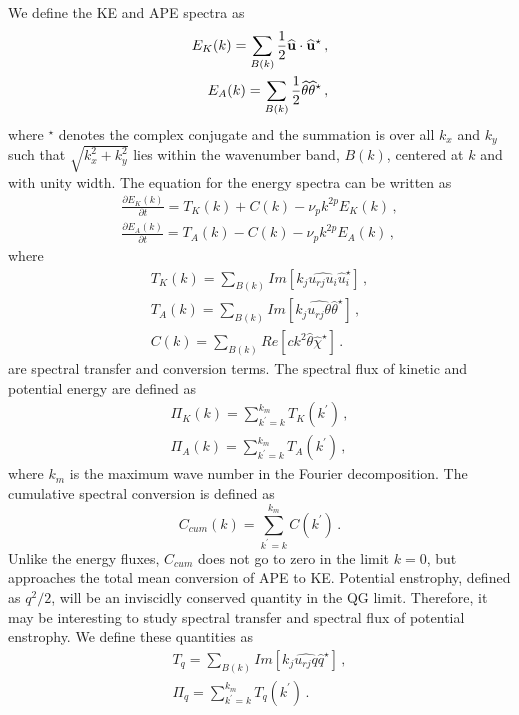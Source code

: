 We define the KE and APE spectra as 
\begin{eqnarray} 
E_K(k) =\sum_{B(k)}  \frac{1}{2}  \widehat{\bf u} \cdot \widehat{\bf u}^{\star}  \, , \\
E_A(k) = \sum_{B(k)} \frac{1}{2} \widehat{\theta} \widehat{\theta}^{\star} \, ,
\end{eqnarray} 
where $ ^{\star} $ denotes the complex conjugate and the summation is over 
all $ k_x $ and $ k_y $ such that $ \sqrt{k_x^2+k_y^{2}} $ lies within the wavenumber band,  $ B(k) $,   centered at $ k $ and with unity width. The equation for the energy spectra can be written as
\begin{eqnarray}
\frac{\partial{E_K}(k)} {\partial t}  = T_K(k) + C (k) - \nu_p k^{2p} E_K(k) \, , \\
\frac{\partial{E_A}(k)} {\partial t}  = T_A(k) - C (k) - \nu_p k^{2p} E_A(k) \, ,
\end{eqnarray} 
where 
\begin{eqnarray}
T_{K}(k) = \sum_{B(k)} Im [  k_j \widehat{u_{rj} u_i} \widehat{u}_i ^{\star} ]  \, , \\
T_{A}(k)  = \sum_{B(k)} Im [ k_j \widehat{u_{rj} \theta} \widehat{\theta} ^{\star}] \, , \\
C (k) = \sum_{B(k)} Re[ c k^{2}\widehat{\theta} \widehat{\chi}^{\star}] \, .
\end{eqnarray} 
are spectral transfer and conversion terms. The spectral flux of kinetic and potential energy are defined as
\begin{eqnarray}
\Pi_K(k) = \sum_{k^{\prime} = k}^{k_{m}} T_K(k^{\prime}) \, , \\
\Pi_A(k) = \sum_{k^{\prime} = k}^{k_{m}} T_A(k^{\prime}) \, ,
\end{eqnarray} 
where $ k_{m} $ is the maximum wave number in the Fourier decomposition. The cumulative spectral conversion is defined as
\begin{equation} \label{Cum}
C_{cum} (k)  = \sum_{k^{\prime} = k}^{k_{m}} C (k^{\prime}) \, .
\end{equation} 
Unlike the energy fluxes, $ C_{cum} $ does not go to zero in the limit $ k =0 $, but approaches the total mean conversion of APE to KE. 
Potential enstrophy,  defined as $ q^2/2 $,  will be an inviscidly conserved quantity in the QG limit. Therefore, it may be interesting to study spectral transfer and spectral flux of potential enstrophy. We define these quantities as
\begin{eqnarray}
T_{q} =  \sum_{B(k)} Im [ k_j \widehat{u_{rj} q} \widehat{q}^{\star}]  \, , \\
\Pi_{q} = \sum_{k^{\prime} = k}^{k_{m}} T_{q} (k^{\prime}) \, .
\end{eqnarray} 
